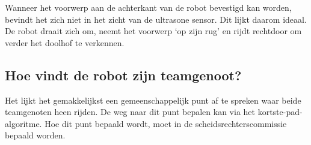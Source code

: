 \documentclass{peno}
\begin{document}
Wanneer het voorwerp aan de achterkant van de robot bevestigd kan worden, bevindt het zich niet in het zicht van de ultrasone sensor. Dit lijkt daarom ideaal. De robot draait zich om, neemt het voorwerp `op zijn rug' en rijdt rechtdoor om verder het doolhof te verkennen.



\subsection*{Hoe vindt de robot zijn teamgenoot?}
Het lijkt het gemakkelijkst een gemeenschappelijk punt af te spreken waar beide teamgenoten heen rijden. De weg naar dit punt bepalen kan via het kortste-pad-algoritme. Hoe dit punt bepaald wordt, moet in de scheidsrechterscommissie bepaald worden.

\end{document}
